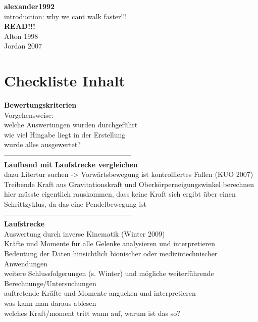 \textbf{alexander1992}\\
introduction: why we cant walk faster!!!\\

\textbf{READ!!!}\\
Alton 1998\\
Jordan 2007\\

\section{Checkliste Inhalt}
\textbf{Bewertungskriterien}\\
Vorgehensweise:\\
welche Auswertungen wurden durchgeführt\\
wie viel Hingabe liegt in der Erstellung\\
wurde alles ausgewertet?\\
------------------------------------------------------\\
\textbf{Laufband mit Laufstrecke vergleichen}\\
dazu Litertur suchen -> Vorwärtsbewegung ist kontrolliertes Fallen (KUO 2007)\\
Treibende Kraft aus Gravitationskraft und Oberkörperneigungswinkel berechnen\\
hier müsste eigentlich rauskommen, dass keine Kraft sich ergibt über einen Schrittzyklus, da das eine Pendelbewegung ist\\
------------------------------------------------------\\
\textbf{Laufstrecke}\\
Auswertung durch inverse Kinematik (Winter 2009)\\
Kräfte und Momente für alle Gelenke analysieren und interpretieren\\
Bedeutung der Daten hinsichtlich bionischer oder medizintechnischer Anwendungen\\
weitere Schlussfolgerungen (s. Winter) und mögliche weiterführende Berechnunge/Untersuchungen\\
auftretende Kräfte und Momente angucken und interpretieren\\
was kann man daraus ablesen\\
welches Kraft/moment tritt wann auf, warum ist das so?\\

